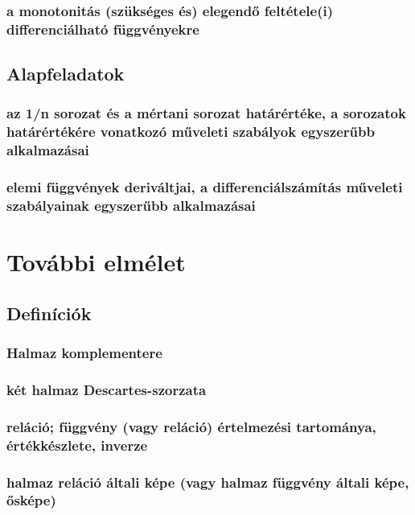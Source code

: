 \documentclass[12pt]{article}
\begin{document}
\subsubsection{a monotonitás (szükséges és) elegendő feltétele(i) differenciálható függvényekre}
 



\subsection{Alapfeladatok}

\subsubsection{az 1/n sorozat és a mértani sorozat határértéke, a sorozatok határértékére vonatkozó műveleti szabályok egyszerűbb alkalmazásai}
\subsubsection{elemi függvények deriváltjai, a differenciálszámítás műveleti szabályainak egyszerűbb alkalmazásai}


\section{További elmélet}

\subsection{Definíciók}

\subsubsection{Halmaz komplementere}
\subsubsection{két halmaz Descartes-szorzata}
\subsubsection{reláció; függvény (vagy reláció) értelmezési tartománya, értékkészlete, inverze}
\subsubsection{halmaz reláció általi képe (vagy halmaz függvény általi képe, ősképe)}
\end{document}
